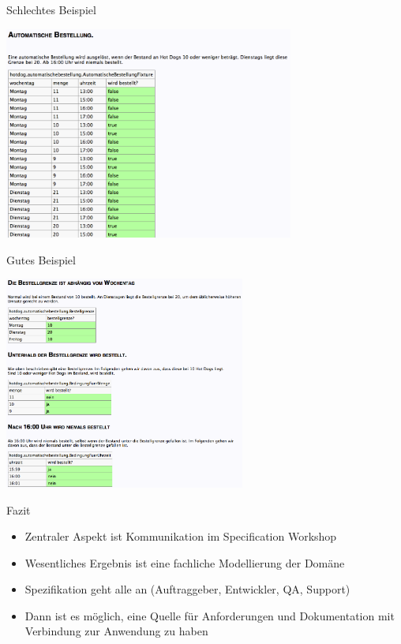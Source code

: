 \begin{frame}{Schlechtes Beispiel}

\begin{center}
\includegraphics[height=7cm]{SchlechtesBeispiel.png} \newline
\end{center}

\end{frame}

\begin{frame}{Gutes Beispiel}

\begin{center}
\includegraphics[height=7cm]{GutesBeispiel.png} \newline
\end{center}

\end{frame}

\begin{frame}{Fazit}

\begin{itemize}
	\item Zentraler Aspekt ist Kommunikation im Specification Workshop
	\item Wesentliches Ergebnis ist eine fachliche Modellierung der Domäne
	\item Spezifikation geht alle an (Auftraggeber, Entwickler, QA, Support)
	\item Dann ist es möglich, eine Quelle für Anforderungen und Dokumentation mit Verbindung zur Anwendung zu haben
\end{itemize}

\end{frame}

